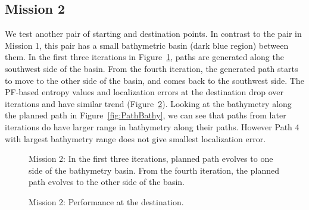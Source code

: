 \subsection{Mission 2}

We test another pair of starting and destination points. In contrast to the pair in Mission 1, this pair has a small bathymetric basin (dark blue region) between them. In the first three iterations in Figure~\ref{fig:M2allpaths}, paths are generated along the southwest side of the basin. From the fourth iteration, the generated path starts to move to the other side of the basin, and comes back to the southwest side. The PF-based entropy values and localization errors at the destination drop over iterations and have similar trend (Figure~\ref{fig:M2}). Looking at the bathymetry along the planned path in Figure~\ref{fig:PathBathy}, we can see that paths from later iterations do have larger range in bathymetry along their paths. However Path 4 with largest bathymetry range does not give smallest localization error.

\begin{figure}[htbp]
\centering
{}
\hfil
{}
\hfil
{}
\hfil
{}
\hfil
{}
\hfil
{}
\caption{Mission 2: In the first three iterations, planned path evolves to one side of the bathymetry basin. From the fourth iteration, the planned path evolves to the other side of the basin.}
\label{fig:M2allpaths}
\end{figure}

\begin{figure}[htbp]
\centering
{}
\hfil
{}
\caption{Mission 2: Performance at the destination.}
\label{fig:M2}
\end{figure}

